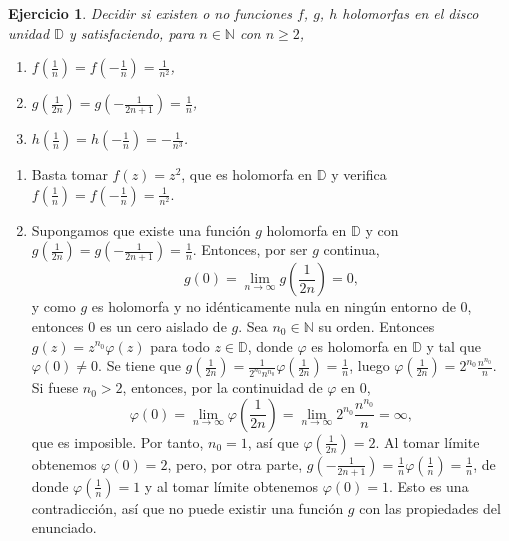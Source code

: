 \documentclass[11pt]{report}
\makeatletter
\renewenvironment{proof}[1][\proofname]{\par
  \pushQED{\qed}%
  \normalfont \topsep\z@skip %
  \trivlist
  \item[\hskip\labelsep
        \itshape
    #1\@addpunct{.}]\ignorespaces
}{%
  \popQED\endtrivlist\@endpefalse
}
\newcommand{\N}{\mathbb N}
\newcommand{\D}{\mathbb D}
\newtheorem{ejercicio}{Ejercicio}
\makeatother
\begin{document}
\begin{ejercicio}
  Decidir si existen o no funciones $f$, $g$, $h$ holomorfas en el disco unidad $\D$ y satisfaciendo, para $n \in \N$ con $n \geq 2$,
  \begin{multicols}{3}
    \begin{enumerate}
    \centering
      \item $f(\frac{1}{n}) = f(-\frac{1}{n}) = \frac{1}{n^2}$,
      \item $g(\frac{1}{2n})  = g(-\frac{1}{2n+1}) = \frac{1}{n}$,
      \item $h(\frac{1}{n}) = h(-\frac{1}{n}) = -\frac{1}{n^3}$.
    \end{enumerate}
  \end{multicols}
\end{ejercicio}

\begin{proof}
  \hfill
  \begin{enumerate}
    \item Basta tomar $f(z)=z^2$, que es holomorfa en $\D$ y verifica $f(\frac{1}{n}) = f(-\frac{1}{n}) = \frac{1}{n^2}$.
    \item Supongamos que existe una función $g$ holomorfa en $\D$ y con $g(\frac{1}{2n}) = g(-\frac{1}{2n+1}) = \frac{1}{n}$. Entonces, por ser $g$ continua,
    \[g(0) = \lim_{n \to \infty} g\left(\frac{1}{2n}\right) = 0,\]
    y como $g$ es holomorfa y no idénticamente nula en ningún entorno de $0$, entonces $0$ es un cero aislado de $g$. Sea $n_0 \in \N$ su orden. Entonces $g(z)=z^{n_0}\varphi(z)$ para todo $z \in \D$, donde $\varphi$ es holomorfa en $\D$ y tal que $\varphi(0) \neq 0$. Se tiene que
    $g\left(\frac{1}{2n}\right) = \frac{1}{2^{n_0}n^{n_0}} \varphi\left(\frac{1}{2n}\right) = \frac{1}{n}$, luego
    $\varphi\left(\frac{1}{2n}\right) = 2^{n_0} \frac{n^{n_0}}{n}$. Si fuese $n_0>2$, entonces, por la continuidad de $\varphi$ en $0$,
    \[\varphi(0) = \lim_{n \to \infty} \varphi\left(\frac{1}{2n}\right) = \lim_{n\to \infty} 2^{n_0} \frac{n^{n_0}}{n} =\infty,\]  
    que es imposible. Por tanto, $n_0 = 1$, así que $\varphi\left(\frac{1}{2n}\right) = 2$. Al tomar límite obtenemos $\varphi(0) = 2$, pero, por otra parte,
    $g\left(-\frac{1}{2n+1}\right) = \frac{1}{n}\varphi\left(\frac{1}{n}\right)= \frac{1}{n}$,
    de donde $\varphi(\frac{1}{n}) = 1$ y al tomar límite obtenemos $\varphi(0) = 1$. Esto es una contradicción, así que no puede existir una función $g$ con las propiedades del enunciado.


\end{enumerate}
\end{proof}
\end{document}
